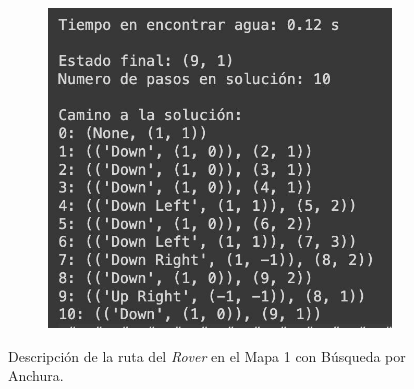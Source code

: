 \documentclass[12pt, letterpaper]{article}
\begin{document}
            \begin{figure}[h!]
                \centering
                \begin{subfigure}[h!]{0.45\textwidth}
                    \centering
                    \includegraphics[scale=0.25,angle=0]{anchuram1ruta.jpeg}
                \end{subfigure}
                \hfill
                \centering
                \caption{Descripción de la ruta del \textit{Rover} en el Mapa 1 con Búsqueda por Anchura.}\label{an_m1_d}
            \end{figure}
\end{document}
